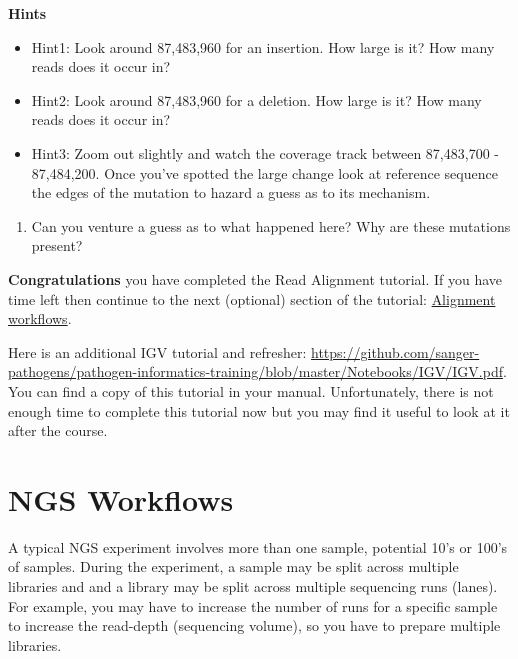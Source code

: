 \documentclass[11pt]{article}
\providecommand{\tightlist}{%
      \setlength{\itemsep}{0pt}\setlength{\parskip}{0pt}}
\begin{document}
\textbf{Hints}

\begin{itemize}
\tightlist
\item
  Hint1: Look around 87,483,960 for an insertion. How large is it? How
  many reads does it occur in?
\item
  Hint2: Look around 87,483,960 for a deletion. How large is it? How
  many reads does it occur in?
\item
  Hint3: Zoom out slightly and watch the coverage track between
  87,483,700 - 87,484,200. Once you've spotted the large change look at
  reference sequence the edges of the mutation to hazard a guess as to
  its mechanism.
\end{itemize}

\begin{enumerate}
\def\labelenumi{\arabic{enumi}.}
\setcounter{enumi}{3}
\tightlist
\item
  Can you venture a guess as to what happened here? Why are these
  mutations present?
\end{enumerate}

    \textbf{Congratulations} you have completed the Read Alignment tutorial.
If you have time left then continue to the next (optional) section of
the tutorial: \href{workflows.ipynb}{Alignment workflows}.

    Here is an additional IGV tutorial and refresher:
\url{https://github.com/sanger-pathogens/pathogen-informatics-training/blob/master/Notebooks/IGV/IGV.pdf}.
You can find a copy of this tutorial in your manual. Unfortunately,
there is not enough time to complete this tutorial now but you may find
it useful to look at it after the course.





\newpage





    \hypertarget{ngs-workflows}{%
\section{NGS Workflows}\label{ngs-workflows}}

A typical NGS experiment involves more than one sample, potential 10's
or 100's of samples. During the experiment, a sample may be split across
multiple libraries and and a library may be split across multiple
sequencing runs (lanes). For example, you may have to increase the
number of runs for a specific sample to increase the read-depth
(sequencing volume), so you have to prepare multiple libraries.
\end{document}
